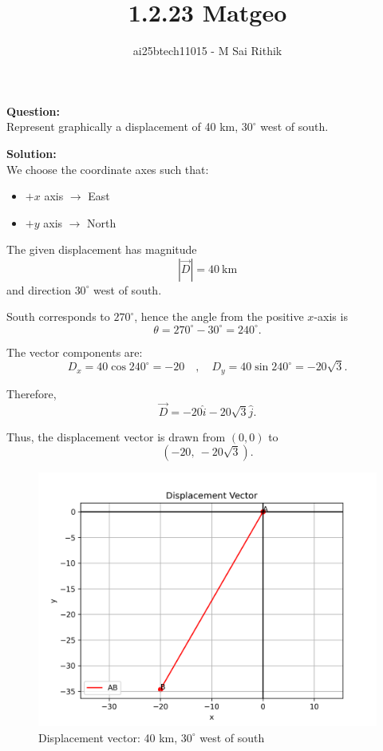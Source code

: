 \documentclass[journal]{IEEEtran}
\title{1.2.23 Matgeo}
\author{ai25btech11015 - M Sai Rithik}
\begin{document}
{\let\newpage\relax\maketitle}

\textbf{Question:} \\
Represent graphically a displacement of 40 km, $30^{\circ}$ west of south.

\textbf{Solution:} \\

We choose the coordinate axes such that:
\begin{itemize}
    \item $+x$ axis $\to$ East
    \item $+y$ axis $\to$ North
\end{itemize}

The given displacement has magnitude
\[
|\vec{D}| = 40 \ \text{km}
\]
and direction $30^{\circ}$ west of south.  

South corresponds to $270^{\circ}$, hence the angle from the positive $x$-axis is
\[
\theta = 270^{\circ} - 30^{\circ} = 240^{\circ}.
\]

The vector components are:
\[
D_x = 40 \cos 240^{\circ} = -20 \quad , \quad
D_y = 40 \sin 240^{\circ} = -20\sqrt{3}.
\]

Therefore,
\[
\vec{D} = -20\hat{i} - 20\sqrt{3}\hat{j}.
\]

Thus, the displacement vector is drawn from $(0,0)$ to
\[
(-20, \ -20\sqrt{3}).
\]

\begin{figure}[h!]
    \centering
    \includegraphics[width=0.65\linewidth]{figs/fig.png}
    \caption{Displacement vector: 40 km, $30^{\circ}$ west of south}
\end{figure}
\end{document}
